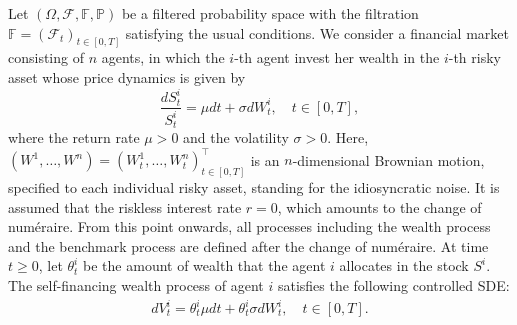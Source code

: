 \documentclass[11pt,times,letter]{article}
\newcommand{\Px}{ \mathbb{P} }
\newcommand{\Fx}{\mathbb{F} }
\newcommand{\F}{\mathcal{F}}
\numberwithin{equation}{section}
\begin{document}
Let $(\Omega,\F,\Fx,\Px)$ be a filtered probability space with the filtration $\Fx=(\F_t)_{t\in[0,T]}$ satisfying the usual conditions. We consider a financial market consisting of $n$ agents, in which the $i$-th agent invest her wealth in the $i$-th risky asset whose price dynamics is given by 
\begin{equation}\label{eq:stock}
  \frac{d S_t^i}{S_{t}^i} = \mu dt +\sigma dW_t^i,\quad t\in [0,T],
\end{equation}
where the return rate $\mu>0$ and the volatility  $\sigma>0$. Here, $(W^1,\ldots,W^n)=(W_t^1,\ldots,W_t^n)^{\top}_{t\in[0,T]}$ is an $n$-dimensional Brownian motion, specified to each individual risky asset, standing for the idiosyncratic noise. It is assumed that the riskless interest rate $r=0$, which amounts to the change of num\'{e}raire. From this point onwards, all processes including the wealth process and the benchmark process are defined after the change of num\'{e}raire. At time $t\geq0$, let $\theta_t^i$ be the amount of wealth that the agent $i$ allocates in the stock $S^i$. The self-financing wealth process of agent $i$ satisfies the following controlled SDE:
 \begin{align}\label{eq:Vt}
dV_t^i=\theta^i_t \mu dt+\theta^i_t\sigma dW_t^i,\quad t\in [0,T].
\end{align}
\end{document}
